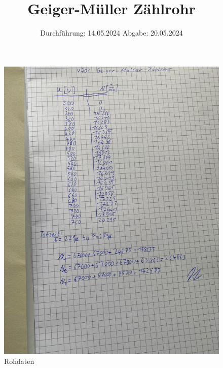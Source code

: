 

\subject{V703}
\title{Geiger-Müller Zählrohr}
\date{%
  Durchführung: 14.05.2024
  \hspace{3em}
  Abgabe: 20.05.2024
}



\maketitle
\thispagestyle{empty}
\tableofcontents
\newpage






\printbibliography{}

\begin{figure}[H]
  \includegraphics{Bilder/rohdaten.jpg}
  \caption{Rohdaten}
\end{figure}


